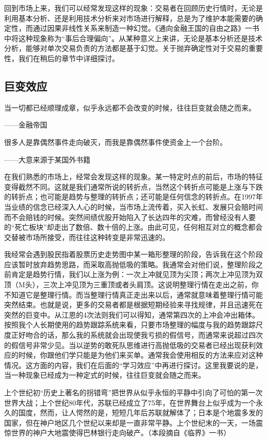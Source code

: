回到市场上来，我们可以经常发现这样的现象：交易者在回顾历史行情时，无论是利用基本分析、还是利用技术分析来对市场进行解释，总是为了维护本能需要的确定性，而通过因果非线性关系来制造一种幻觉。《通向金融王国的自由之路》一书中将这种现象称为“事后合理偏向”。从某种意义上来讲，无论是基本分析还是技术分析，能够对单次交易负责的方法都是基于幻觉。关于抛弃确定性对于交易的重要性，我们在稍后的章节中详细探讨。

\subsection{巨变效应}

{\kaishu
当一切都已经顺理成章，似乎永远都不会改变的时候，往往巨变就会随之而来。

\hfill ——金融帝国

很多人是靠偶然事件走向破灭，而我是靠偶然事件使资金上一个台阶。

\hfill ——大意来源于某国外书籍
}

在我们熟悉的市场上，经常会发现这样的现象。某一特定时点的前后，市场的特征变得截然不同。这就是我们通常所说的转折点，当然这个转折点可能是上涨与下跌的转折点；也可能是趋势与整理的转折点；还可能是任何信念的转折点。在1997年当业绩的信念已经深入人心的时候，当市场上流传着，买入长虹、发展只会赔时间而不会赔钱的时候。突然间绩优股开始陷入了长达四年的灾难，而曾经没有人要的“死亡板块”却走出了数倍、数十倍的上涨。由此可见，任何相互对立的概念都会交替被市场所接受，而往往这种转变是非常迅速的。

我经常会遇到股民指着股票历史走势图中某一箱形整理的阶段，告诉我在这个阶段应该暂时放弃趋势思路，而采取高抛低吸的策略。我通常会对他们说，整理阶段之前肯定是趋势行情，我们以上涨为例：一次上冲就见顶为尖顶；两次上冲见顶为双顶（M头），三次上冲见顶为三重顶或者头肩顶。这说明整理行情在走出之前，你不知道它是整理行情。而当整理行情真正走出来以后，通常就意味着整理行情可能突然结束。也就是说，更多的交易者都是根据短期经验来寻找规律，并且迅速死在突然的巨变中。从江恩的4次法则我们可以得知，通常第四次的上冲会冲出箱体。按照我个人长期使用的趋势跟踪系统来看，只要市场整理的幅度与我的趋势跟踪尺度正好吻合的话，那么我的系统就会出现使我亏损的假信号，而通常来说超过四次的假信号非常少见。当以逆势的敢死队思维进行高抛低吸的交易者已经出现获利效应的时候，你跟他们学只能是为他们来买单。通常我会使用相反的方法来应对这种情况。这方面的内容，我们在后面的“学习效应”中再进行探讨。这里我要说的是，当一种现象已经成为一种定式的时候，往往巨变就会随之而来。

{\kaishu
上个世纪初“历史上著名的拐错弯”把世界从似乎永恒的平静中引向了可怕的第一次世界大战；上个世纪80年代，苏联已经成立了75年，在世界舞台上似乎成为一个永久的国度，然而，让人愕然的是，短短几年后苏联就解体了；日本是个地震多发的国家，但在神户地区几个世纪以来却是一直非常平静。上个世纪末的一天，一场震惊世界的神户大地震使得巴林银行走向破产。（本段摘自《临界》一书）
}

